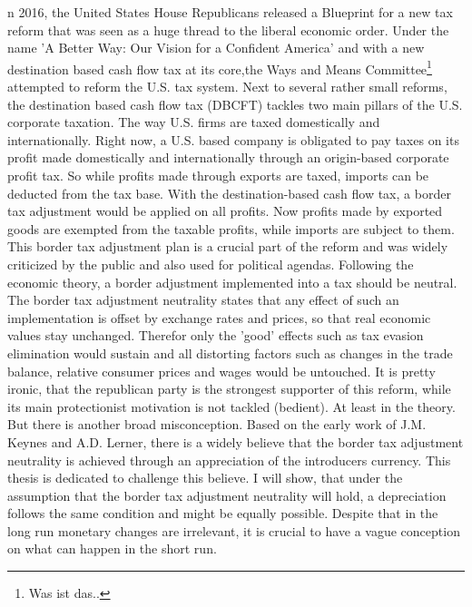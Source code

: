 n 2016, the United States House Republicans released a Blueprint for a new tax reform that was seen as a huge thread to the liberal economic order. Under the name 'A Better Way: Our Vision for a Confident America' and with a new destination based cash flow tax at its core,the Ways and Means Committee\footnote{Was ist das.. } attempted to reform the U.S. tax system. Next to several rather small reforms, the destination based cash flow tax (DBCFT) tackles two main pillars of the U.S. corporate taxation. The way U.S. firms are taxed domestically and internationally. Right now, a U.S. based company is obligated to pay taxes on its profit made domestically and internationally through an origin-based corporate profit tax. So while profits made through exports are taxed, imports can be deducted from the tax base. With the destination-based cash flow tax, a border tax adjustment would be applied on all profits. 
Now profits made by exported goods are exempted from the taxable profits, while imports are subject to them. This border tax adjustment plan is a crucial part of the reform and was widely criticized by the public and also used for political agendas. %
Following the economic theory, a border adjustment implemented into a tax should be neutral. The border tax adjustment neutrality states that any effect of such an implementation is offset by exchange rates and prices, so that real economic values stay unchanged. Therefor only the 'good' effects such as tax evasion elimination would sustain and all distorting factors such as changes in the trade balance, relative consumer prices and wages would be untouched. It is pretty ironic, that the republican party is the strongest supporter of this reform, while its main protectionist motivation is not tackled (bedient). At least in the theory. But there is another broad misconception. Based on the early work of J.M. Keynes and A.D. Lerner, there is a widely believe that the border tax adjustment neutrality is achieved through an appreciation of the introducers currency. This thesis is dedicated to challenge this believe. I will show, that under the assumption that the border tax adjustment neutrality will hold, a depreciation follows the same condition and might be equally possible. Despite that in the long run monetary changes are irrelevant, it is crucial to have a vague conception on what can happen in the short run. 




